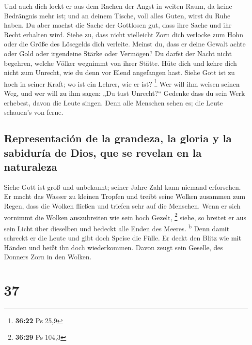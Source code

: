  Und auch dich lockt er aus dem Rachen der Angst in
weiten Raum, da keine Bedrängnis mehr ist; und an deinem Tische, voll
alles Guten, wirst du Ruhe haben.  Du aber machst die
Sache der Gottlosen gut, dass ihre Sache und ihr Recht erhalten wird.
 Siehe zu, dass nicht vielleicht Zorn dich verlocke zum
Hohn oder die Größe des Lösegelds dich verleite.  Meinst
du, dass er deine Gewalt achte oder Gold oder irgendeine Stärke oder
Vermögen?  Du darfst der Nacht nicht begehren, welche
Völker wegnimmt von ihrer Stätte.  Hüte dich und kehre
dich nicht zum Unrecht, wie du denn vor Elend angefangen hast.
 Siehe Gott ist zu hoch in seiner Kraft; wo ist ein
Lehrer, wie er ist? \footnote{\textbf{36:22} Ps 25,9} 
Wer will ihm weisen seinen Weg, und wer will zu ihm sagen: „Du tust
Unrecht?{}``  Gedenke dass du sein Werk erhebest, davon
die Leute singen.  Denn alle Menschen sehen es; die Leute
schauen's von ferne.

\hypertarget{representaciuxf3n-de-la-grandeza-la-gloria-y-la-sabiduruxeda-de-dios-que-se-revelan-en-la-naturaleza}{%
\subsection{Representación de la grandeza, la gloria y la sabiduría de
Dios, que se revelan en la
naturaleza}\label{representaciuxf3n-de-la-grandeza-la-gloria-y-la-sabiduruxeda-de-dios-que-se-revelan-en-la-naturaleza}}

 Siehe Gott ist groß und unbekannt; seiner Jahre Zahl
kann niemand erforschen.  Er macht das Wasser zu kleinen
Tropfen und treibt seine Wolken zusammen zum Regen,  dass
die Wolken fließen und triefen sehr auf die Menschen. 
Wenn er sich vornimmt die Wolken auszubreiten wie sein hoch Gezelt,
\footnote{\textbf{36:29} Ps 104,3}  siehe, so breitet er
aus sein Licht über dieselben und bedeckt alle Enden des Meeres.
\textsuperscript{b}  Denn damit schreckt er die Leute und
gibt doch Speise die Fülle.  Er deckt den Blitz wie mit
Händen und heißt ihn doch wiederkommen.  Davon zeugt sein
Geselle, des Donners Zorn in den Wolken.

\hypertarget{section-36}{%
\section{37}\label{section-36}}

